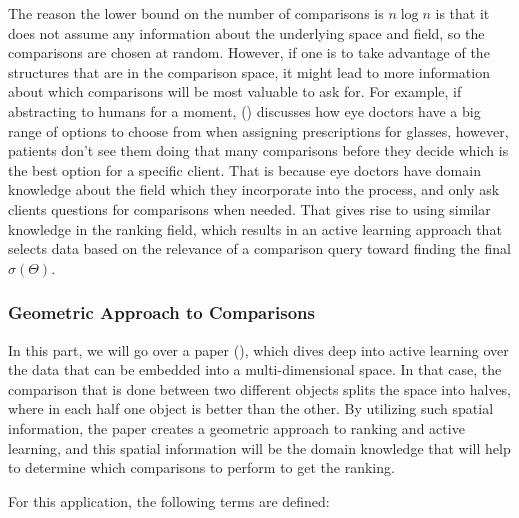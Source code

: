 \documentclass[
  letterpaper,
  numbers=noenddot,
  DIV=11,
  oneside]{scrreprt}
\theoremstyle{remark}
\begin{document}
The reason the lower bound on the number of comparisons is \(n\log n\)
is that it does not assume any information about the underlying space
and field, so the comparisons are chosen at random. However, if one is
to take advantage of the structures that are in the comparison space, it
might lead to more information about which comparisons will be most
valuable to ask for. For example, if abstracting to humans for a moment,
() discusses how eye doctors
have a big range of options to choose from when assigning prescriptions
for glasses, however, patients don't see them doing that many
comparisons before they decide which is the best option for a specific
client. That is because eye doctors have domain knowledge about the
field which they incorporate into the process, and only ask clients
questions for comparisons when needed. That gives rise to using similar
knowledge in the ranking field, which results in an active learning
approach that selects data based on the relevance of a comparison query
toward finding the final \(\sigma(\Theta)\).

\subsubsection{Geometric Approach to
Comparisons}\label{geometric-approach-to-comparisons}

In this part, we will go over a paper (), which dives deep into active learning over the data that
can be embedded into a multi-dimensional space. In that case, the
comparison that is done between two different objects splits the space
into halves, where in each half one object is better than the other. By
utilizing such spatial information, the paper creates a geometric
approach to ranking and active learning, and this spatial information
will be the domain knowledge that will help to determine which
comparisons to perform to get the ranking.

For this application, the following terms are defined:
\end{document}
